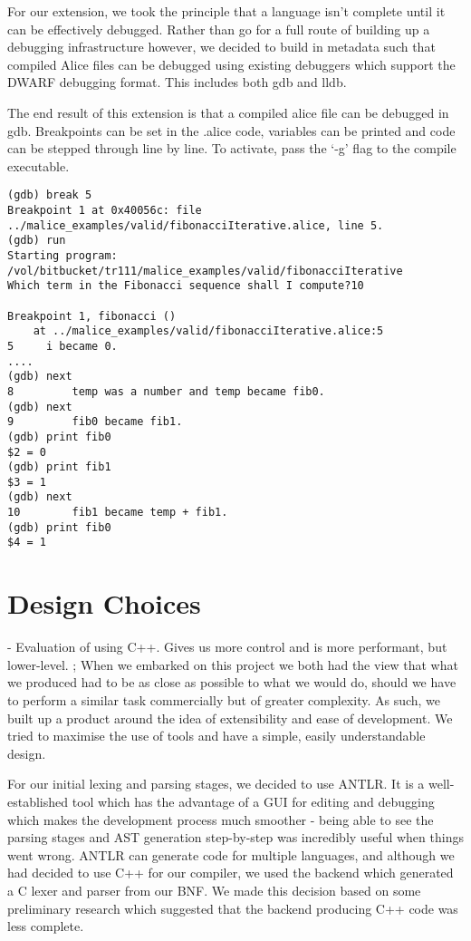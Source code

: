 \documentclass[a4wide, 11pt]{article}
\begin{document}
For our extension, we took the principle that a language isn't complete until it can be effectively debugged. Rather than go for a full route of building up a debugging infrastructure however, we decided to build in metadata such that compiled Alice files can be debugged using existing debuggers which support the DWARF debugging format. This includes both gdb and lldb.

The end result of this extension is that a compiled alice file can be debugged in gdb. Breakpoints can be set in the .alice code, variables can be printed and code can be stepped through line by line. To activate, pass the `-g' flag to the compile executable.

\begin{verbatim}
(gdb) break 5
Breakpoint 1 at 0x40056c: file ../malice_examples/valid/fibonacciIterative.alice, line 5.
(gdb) run
Starting program: /vol/bitbucket/tr111/malice_examples/valid/fibonacciIterative 
Which term in the Fibonacci sequence shall I compute?10

Breakpoint 1, fibonacci ()
    at ../malice_examples/valid/fibonacciIterative.alice:5
5     i became 0.
....
(gdb) next
8         temp was a number and temp became fib0.
(gdb) next
9         fib0 became fib1.
(gdb) print fib0
$2 = 0
(gdb) print fib1
$3 = 1
(gdb) next
10        fib1 became temp + fib1.
(gdb) print fib0
$4 = 1
\end{verbatim}


\section{Design Choices}

- Evaluation of using C++. Gives us more control and is more performant, but lower-level.
;
When we embarked on this project we both had the view that what we produced had to be as close as possible to what we would do, should we have to perform a similar task commercially but of greater complexity. As such, we built up a product around the idea of extensibility and ease of development. We tried to maximise the use of tools and have a simple, easily understandable design.

For our initial lexing and parsing stages, we decided to use ANTLR. It is a well-established tool which has the advantage of a GUI for editing and debugging which makes the development process much smoother - being able to see the parsing stages and AST generation step-by-step was incredibly useful when things went wrong. ANTLR can generate code for multiple languages, and although we had decided to use C++ for our compiler, we used the backend which generated a C lexer and parser from our BNF. We made this decision based on some preliminary research which suggested that the backend producing C++ code was less complete. 
\end{document}

